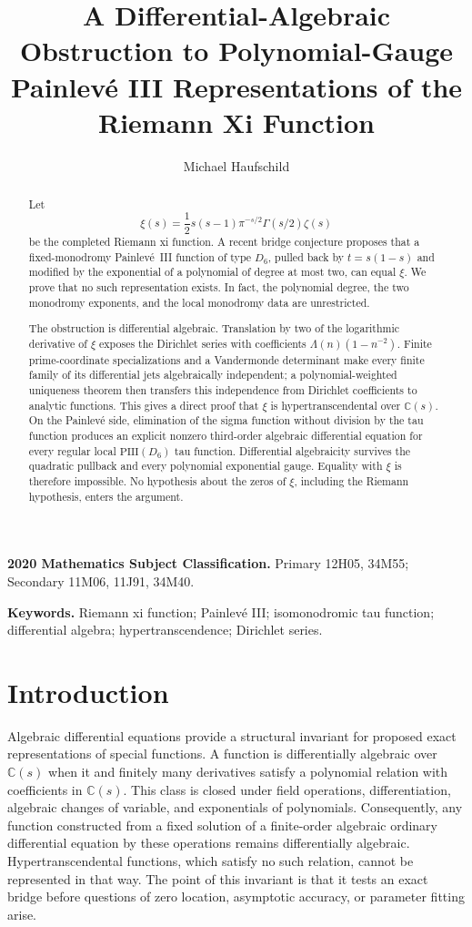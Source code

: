 \documentclass[11pt]{article}
\title{\bfseries A Differential-Algebraic Obstruction to Polynomial-Gauge\\
Painlev\'e III Representations of the Riemann Xi Function}
\author{Michael Haufschild}
\date{}
\numberwithin{equation}{section}
\theoremstyle{definition}
\theoremstyle{remark}
\newcommand{\C}{\mathbb C}
\begin{document}
\maketitle

\begin{abstract}
Let
\[
 \xi(s)=\frac12s(s-1)\pi^{-s/2}\Gamma(s/2)\zeta(s)
\]
be the completed Riemann xi function.  A recent bridge conjecture proposes that a fixed-monodromy
Painlev\'e~III function of type $D_6$, pulled back by $t=s(1-s)$ and modified by the exponential
of a polynomial of degree at most two, can equal $\xi$.  We prove that no such representation
exists.  In fact, the polynomial degree, the two monodromy exponents, and the local monodromy data
are unrestricted.

The obstruction is differential algebraic.  Translation by two of the logarithmic derivative of
$\xi$ exposes the Dirichlet series with coefficients $\Lambda(n)(1-n^{-2})$.  Finite
prime-coordinate specializations and a Vandermonde determinant make every finite family of its
differential jets algebraically independent; a polynomial-weighted uniqueness theorem then
transfers this independence from Dirichlet coefficients to analytic functions.  This gives a
direct proof that $\xi$ is hypertranscendental over $\C(s)$.  On the Painlev\'e side, elimination
of the sigma function without division by the tau function produces an explicit nonzero
third-order algebraic differential equation for every regular local $\mathrm{PIII}(D_6)$ tau
function.  Differential algebraicity survives the quadratic pullback and every polynomial
exponential gauge.  Equality with $\xi$ is therefore impossible.  No hypothesis about the zeros
of $\xi$, including the Riemann hypothesis, enters the argument.
\end{abstract}

\noindent\textbf{2020 Mathematics Subject Classification.}
Primary 12H05, 34M55; Secondary 11M06, 11J91, 34M40.

\noindent\textbf{Keywords.}
Riemann xi function; Painlev\'e III; isomonodromic tau function; differential algebra;
hypertranscendence; Dirichlet series.

\section{Introduction}
\label{sec:introduction}

Algebraic differential equations provide a structural invariant for proposed exact
representations of special functions.  A function is differentially algebraic over $\C(s)$ when
it and finitely many derivatives satisfy a polynomial relation with coefficients in $\C(s)$.
This class is closed under field operations, differentiation, algebraic changes of variable, and
exponentials of polynomials.  Consequently, any function constructed from a fixed solution of a
finite-order algebraic ordinary differential equation by these operations remains
differentially algebraic.  Hypertranscendental functions, which satisfy no such relation, cannot
be represented in that way.  The point of this invariant is that it tests an exact bridge before
questions of zero location, asymptotic accuracy, or parameter fitting arise.
\end{document}
